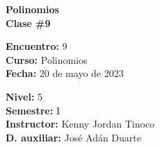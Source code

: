 \begin{center} \textbf
{
    \Large Polinomios \\ \vspace{2mm}Clase \#9
}
\end{center}

\begin{multicols}{2}
{
    \textbf{Encuentro:} 9\\
    \textbf{Curso:} Polinomios\\
    \textbf{Fecha:} 20 de mayo de 2023\\
    \begin{flushright}
        \textbf{Nivel:} 5\\
        \textbf{Semestre:} I\\
        \textbf{Instructor:} Kenny Jordan Tinoco\\
        \textbf{D. auxiliar: }José Adán Duarte
    \end{flushright}
}
\end{multicols}

\thispagestyle{first-page-style}